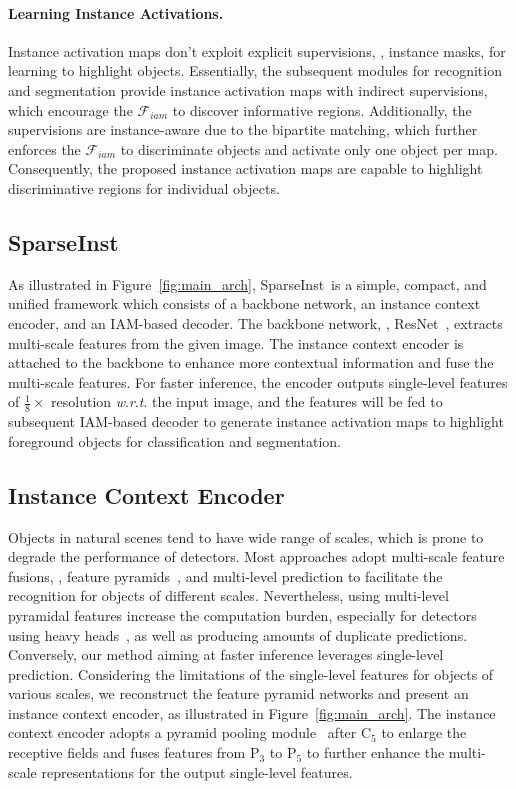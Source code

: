 \documentclass[10pt,twocolumn,letterpaper]{article}
\newcommand{\name}{SparseInst}
\renewcommand{\wrt}{\textit{w}.\textit{r}.\textit{t}. }
\begin{document}
\paragraph{Learning Instance Activations.}
\label{learn_iam}
Instance activation maps don't exploit explicit supervisions, \eg, instance masks, for learning to highlight objects.
Essentially, the subsequent modules for recognition and segmentation provide instance activation maps with indirect supervisions, which encourage the $\mathcal{F}_{iam}$ to discover informative regions.
Additionally, the supervisions are instance-aware due to the bipartite matching, which further enforces the $\mathcal{F}_{iam}$ to discriminate objects and activate only one object per map.
Consequently, the proposed instance activation maps are capable to highlight discriminative regions for individual objects.




\subsection{\name}
As illustrated in Figure~\ref{fig:main_arch}, \name~is a simple, compact, and unified framework which consists of a backbone network, an instance context encoder, and an IAM-based decoder. The backbone network, \eg, ResNet~\cite{HeZRS16}, extracts multi-scale features from the given image. The instance context encoder is attached to the backbone to enhance more contextual information and fuse the multi-scale features.
For faster inference, the encoder outputs single-level features of $\frac{1}{8}\times$ resolution \wrt the input image, and the features will be fed to subsequent IAM-based decoder to generate instance activation maps to highlight foreground objects for classification and segmentation. 

\subsection{Instance Context Encoder}
Objects in natural scenes tend to have wide range of scales, which is prone to degrade the performance of detectors.
Most approaches adopt multi-scale feature fusions, \eg, feature pyramids~\cite{LinDGHHB17}, and multi-level prediction to facilitate the recognition for objects of different scales.
Nevertheless, using multi-level pyramidal features increase the computation burden, especially for detectors using heavy heads~\cite{FocalLinGGHD17,FCOSTianSCH19}, as well as producing amounts of duplicate predictions.
Conversely, our method aiming at faster inference leverages single-level prediction.
Considering the limitations of the single-level features for objects of various scales, we reconstruct the feature pyramid networks and present an instance context encoder, as illustrated in Figure~\ref{fig:main_arch}.
The instance context encoder adopts a pyramid pooling module~\cite{ZhaoSQWJ17} after C$_5$ to enlarge the receptive fields and fuses features from P$_3$ to P$_5$ to further enhance the multi-scale representations for the output single-level features.
\end{document}

